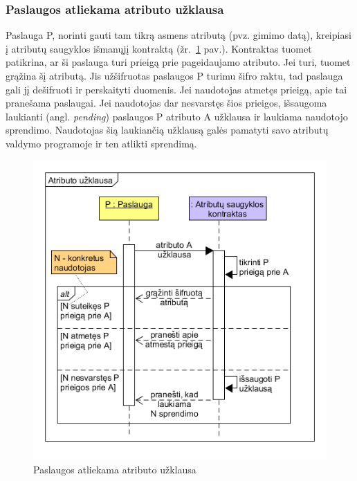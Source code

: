 \subsubsection{Paslaugos atliekama atributo užklausa} \label{BCIDM:askForAttribute}

Paslauga P, norinti gauti tam tikrą asmens atributą (pvz. gimimo datą),
kreipiasi į atributų saugyklos išmanųjį kontraktą (žr.\hypertarget{fig:askForAttributeSequence}{~\ref{fig:askForAttributeSequence} pav.}).
Kontraktas tuomet patikrina, ar ši paslauga turi prieigą prie pageidaujamo atributo. Jei turi, tuomet grąžina šį atributą. Jis
užšifruotas paslaugos P turimu šifro raktu, tad paslauga gali jį dešifruoti ir perskaityti duomenis. Jei
naudotojas atmetęs prieigą, apie tai pranešama paslaugai. Jei naudotojas dar nesvarstęs šios prieigos, išsaugoma laukianti
(angl. \textit{pending}) paslaugos P atributo A užklausa ir laukiama naudotojo sprendimo. Naudotojas šią laukiančią užklausą galės pamatyti savo 
atributų valdymo programoje ir ten atlikti sprendimą.

\begin{figure}[H]
    \centering
    \includegraphics[scale=0.7]{img/askForAttributeSequence}
    \caption{Paslaugos atliekama atributo užklausa}
    \label{fig:askForAttributeSequence}
\end{figure}

